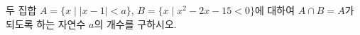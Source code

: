 두 집합 $A=\{x \mid |x-1|<a\}$, $B=\{x \mid x^2-2x-15<0\}$에 대하여 $A\cap B=A$가 되도록 하는 자연수 $a$의 개수를 구하시오.
